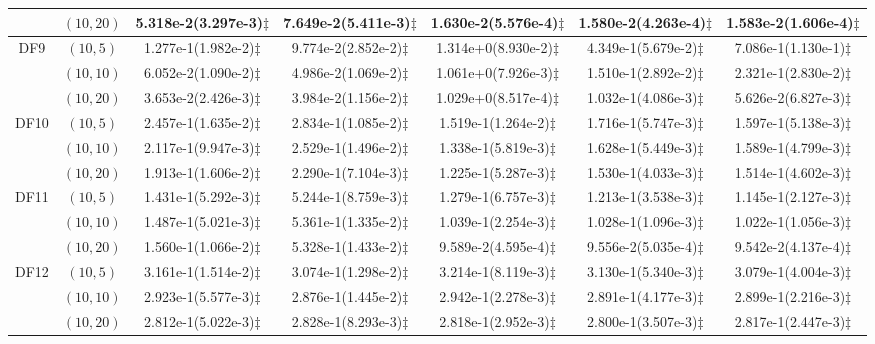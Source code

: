 \documentclass[review]{elsarticle}
\begin{document}
\begin{table*}[!htb]
{\begin{tabular}{ccccccc}
&$(10,20)$ &5.318e-2(3.297e-3)$\ddagger$ &7.649e-2(5.411e-3)$\ddagger$ &1.630e-2(5.576e-4)$\ddagger$ &1.580e-2(4.263e-4)$\ddagger$ &1.583e-2(1.606e-4)$\ddagger$ \\
\hline  \multirow{3}{*}{DF9}
&$(10,5)$ &1.277e-1(1.982e-2)$\ddagger$ &9.774e-2(2.852e-2)$\ddagger$ &1.314e+0(8.930e-2)$\ddagger$ &4.349e-1(5.679e-2)$\ddagger$ &7.086e-1(1.130e-1)$\ddagger$ \\
&$(10,10)$ &6.052e-2(1.090e-2)$\ddagger$ &4.986e-2(1.069e-2)$\ddagger$ &1.061e+0(7.926e-3)$\ddagger$ &1.510e-1(2.892e-2)$\ddagger$ &2.321e-1(2.830e-2)$\ddagger$ \\
&$(10,20)$ &3.653e-2(2.426e-3)$\ddagger$ &3.984e-2(1.156e-2)$\ddagger$ &1.029e+0(8.517e-4)$\ddagger$ &1.032e-1(4.086e-3)$\ddagger$ &5.626e-2(6.827e-3)$\ddagger$ \\
\hline  \multirow{3}{*}{DF10}
&$(10,5)$ &2.457e-1(1.635e-2)$\ddagger$ &2.834e-1(1.085e-2)$\ddagger$ &1.519e-1(1.264e-2)$\ddagger$ &1.716e-1(5.747e-3)$\ddagger$ &1.597e-1(5.138e-3)$\ddagger$ \\
&$(10,10)$ &2.117e-1(9.947e-3)$\ddagger$ &2.529e-1(1.496e-2)$\ddagger$ &1.338e-1(5.819e-3)$\ddagger$ &1.628e-1(5.449e-3)$\ddagger$ &1.589e-1(4.799e-3)$\ddagger$ \\
&$(10,20)$ &1.913e-1(1.606e-2)$\ddagger$ &2.290e-1(7.104e-3)$\ddagger$ &1.225e-1(5.287e-3)$\ddagger$ &1.530e-1(4.033e-3)$\ddagger$ &1.514e-1(4.602e-3)$\ddagger$ \\
\hline  \multirow{3}{*}{DF11}
&$(10,5)$ &1.431e-1(5.292e-3)$\ddagger$ &5.244e-1(8.759e-3)$\ddagger$ &1.279e-1(6.757e-3)$\ddagger$ &1.213e-1(3.538e-3)$\ddagger$ &1.145e-1(2.127e-3)$\ddagger$ \\
&$(10,10)$ &1.487e-1(5.021e-3)$\ddagger$ &5.361e-1(1.335e-2)$\ddagger$ &1.039e-1(2.254e-3)$\ddagger$ &1.028e-1(1.096e-3)$\ddagger$ &1.022e-1(1.056e-3)$\ddagger$ \\
&$(10,20)$ &1.560e-1(1.066e-2)$\ddagger$ &5.328e-1(1.433e-2)$\ddagger$ &9.589e-2(4.595e-4)$\ddagger$ &9.556e-2(5.035e-4)$\ddagger$ &9.542e-2(4.137e-4)$\ddagger$ \\
\hline  \multirow{3}{*}{DF12}
&$(10,5)$ &3.161e-1(1.514e-2)$\ddagger$ &3.074e-1(1.298e-2)$\ddagger$ &3.214e-1(8.119e-3)$\ddagger$ &3.130e-1(5.340e-3)$\ddagger$ &3.079e-1(4.004e-3)$\ddagger$ \\
&$(10,10)$ &2.923e-1(5.577e-3)$\ddagger$ &2.876e-1(1.445e-2)$\ddagger$ &2.942e-1(2.278e-3)$\ddagger$ &2.891e-1(4.177e-3)$\ddagger$ &2.899e-1(2.216e-3)$\ddagger$ \\
&$(10,20)$ &2.812e-1(5.022e-3)$\ddagger$ &2.828e-1(8.293e-3)$\ddagger$ &2.818e-1(2.952e-3)$\ddagger$ &2.800e-1(3.507e-3)$\ddagger$ &2.817e-1(2.447e-3)$\ddagger$ \\

\end{tabular}}
\end{table*}
\end{document}
